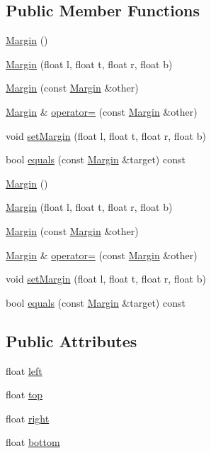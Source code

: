 \subsection*{Public Member Functions}
\begin{DoxyCompactItemize}
\item 
\hyperlink{classui_1_1Margin_ac461471a86c6a3c397c0107fa49734d5}{Margin} ()
\item 
\hyperlink{classui_1_1Margin_a8174891a0d0fd4234c611446d28f739b}{Margin} (float l, float t, float r, float b)
\item 
\hyperlink{classui_1_1Margin_aa11e550dc1c950e606ed6ded113c12d3}{Margin} (const \hyperlink{classui_1_1Margin}{Margin} \&other)
\item 
\hyperlink{classui_1_1Margin}{Margin} \& \hyperlink{classui_1_1Margin_aa9b38e77be87eb7cecaf3be42619b6ff}{operator=} (const \hyperlink{classui_1_1Margin}{Margin} \&other)
\item 
void \hyperlink{classui_1_1Margin_a214209519a4542d30957d7e3211eb1a5}{set\+Margin} (float l, float t, float r, float b)
\item 
bool \hyperlink{classui_1_1Margin_ab9d090f9513728f6d8cc1115800f5062}{equals} (const \hyperlink{classui_1_1Margin}{Margin} \&target) const
\item 
\hyperlink{classui_1_1Margin_ac461471a86c6a3c397c0107fa49734d5}{Margin} ()
\item 
\hyperlink{classui_1_1Margin_a8174891a0d0fd4234c611446d28f739b}{Margin} (float l, float t, float r, float b)
\item 
\hyperlink{classui_1_1Margin_aa11e550dc1c950e606ed6ded113c12d3}{Margin} (const \hyperlink{classui_1_1Margin}{Margin} \&other)
\item 
\hyperlink{classui_1_1Margin}{Margin} \& \hyperlink{classui_1_1Margin_a3e47b96ba1dfce60abbc81f0bc9d486e}{operator=} (const \hyperlink{classui_1_1Margin}{Margin} \&other)
\item 
void \hyperlink{classui_1_1Margin_a214209519a4542d30957d7e3211eb1a5}{set\+Margin} (float l, float t, float r, float b)
\item 
bool \hyperlink{classui_1_1Margin_ab9d090f9513728f6d8cc1115800f5062}{equals} (const \hyperlink{classui_1_1Margin}{Margin} \&target) const
\end{DoxyCompactItemize}
\subsection*{Public Attributes}
\begin{DoxyCompactItemize}
\item 
float \hyperlink{classui_1_1Margin_aa3922f4fe98e73c51c77e90a74213690}{left}
\item 
float \hyperlink{classui_1_1Margin_a559e680b2333bf071c2d7d35a25a0ea6}{top}
\item 
float \hyperlink{classui_1_1Margin_a8b6549daa5fe51eb62c0a7f4d3472159}{right}
\item 
float \hyperlink{classui_1_1Margin_a7be821730e1874ef5cb65f93bf880147}{bottom}
\end{DoxyCompactItemize}

